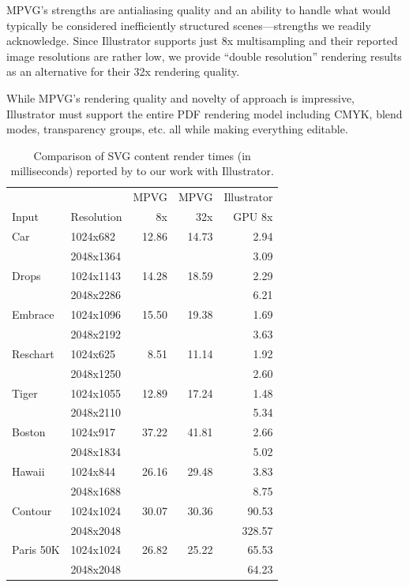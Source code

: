 MPVG's strengths are antialiasing quality and an ability to handle what would typically be considered
inefficiently structured scenes---strengths we readily acknowledge.
Since Illustrator supports just 8x multisampling and their reported
image resolutions are rather low, we provide ``double resolution''
rendering results as an alternative for their 32x rendering quality.

While MPVG's rendering quality and novelty of approach is impressive,
Illustrator must support the entire PDF rendering model including CMYK, blend modes,
transparency groups, etc. all while making everything editable.

\begin{table}
    \begin{tabular}{| l | l || r | r | r |}
    \hline
      &            & MPVG & MPVG & Illustrator \\
Input & Resolution & 8x & 32x & GPU 8x \\
    \hline
    \hline

Car & 1024x682 & 12.86 & 14.73 & 2.94 \\
    & 2048x1364 & & & 3.09
\\ \hline
Drops & 1024x1143 &14.28 & 18.59 & 2.29 \\
    & 2048x2286 & & & 6.21
\\ \hline
Embrace & 1024x1096 &15.50 & 19.38 &  1.69 \\
    & 2048x2192 & & & 3.63
\\ \hline
Reschart & 1024x625 &8.51 & 11.14 & 1.92 \\
    & 2048x1250 & & & 2.60
\\ \hline
Tiger & 1024x1055 &12.89 & 17.24 &  1.48 \\
    & 2048x2110 & & & 5.34
\\ \hline
Boston & 1024x917 &37.22 & 41.81 &  2.66 \\
    & 2048x1834 & & & 5.02
\\ \hline
Hawaii & 1024x844 &26.16  &29.48 &  3.83 \\
    & 2048x1688 & & & 8.75
\\ \hline
Contour & 1024x1024 &30.07 & 30.36 & 90.53 \\
    & 2048x2048 & & & 328.57
\\ \hline
Paris 50K & 1024x1024 &26.82 & 25.22 & 65.53 \\
    & 2048x2048 & & & 64.23
\\ \hline

    \end{tabular}
    \caption{Comparison of SVG content render times (in milliseconds) reported by \protect\cite{GanEtAl14} to our work with Illustrator.}
\label{table:mpvg}

\end{table}
